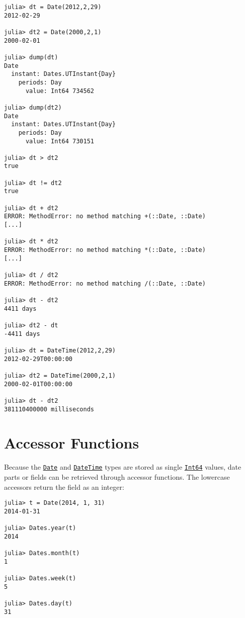 \begin{verbatim}
julia> dt = Date(2012,2,29)
2012-02-29

julia> dt2 = Date(2000,2,1)
2000-02-01

julia> dump(dt)
Date
  instant: Dates.UTInstant{Day}
    periods: Day
      value: Int64 734562

julia> dump(dt2)
Date
  instant: Dates.UTInstant{Day}
    periods: Day
      value: Int64 730151

julia> dt > dt2
true

julia> dt != dt2
true

julia> dt + dt2
ERROR: MethodError: no method matching +(::Date, ::Date)
[...]

julia> dt * dt2
ERROR: MethodError: no method matching *(::Date, ::Date)
[...]

julia> dt / dt2
ERROR: MethodError: no method matching /(::Date, ::Date)

julia> dt - dt2
4411 days

julia> dt2 - dt
-4411 days

julia> dt = DateTime(2012,2,29)
2012-02-29T00:00:00

julia> dt2 = DateTime(2000,2,1)
2000-02-01T00:00:00

julia> dt - dt2
381110400000 milliseconds
\end{verbatim}



\hypertarget{15274886386548419130}{}


\section{Accessor Functions}



Because the \hyperlink{4488183467971164548}{\texttt{Date}} and \hyperlink{17572689933274889838}{\texttt{DateTime}} types are stored as single \hyperlink{7720564657383125058}{\texttt{Int64}} values, date parts or fields can be retrieved through accessor functions. The lowercase accessors return the field as an integer:




\begin{verbatim}
julia> t = Date(2014, 1, 31)
2014-01-31

julia> Dates.year(t)
2014

julia> Dates.month(t)
1

julia> Dates.week(t)
5

julia> Dates.day(t)
31
\end{verbatim}




